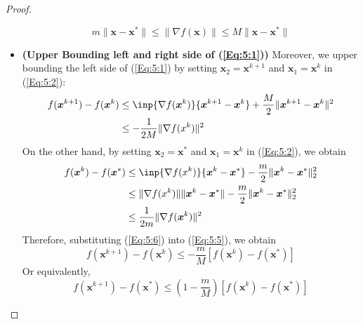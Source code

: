 \begin{proof}
\begin{itemize}
\begin{equation}
m\|\bm x-\bm x^*\|\le\|\nabla f(\bm x)\|\le M\|\bm x-\bm x^*\|
\end{equation}
\item
\textbf{(Upper Bounding left and right side of (\ref{Eq:5:1}))}
Moreover, we upper bounding the left side of (\ref{Eq:5:1}) by setting $\bm x_2 = \bm x^{k+1}$ and $\bm x_1 = \bm x^k$ in (\ref{Eq:5:2}):
\begin{equation}\label{Eq:5:5}
\begin{aligned}
f(\bm x^{k+1}) - f(\bm x^k)&\le \inp{\nabla f(\bm x^k)}{\bm x^{k+1} - \bm x^k}+\frac{M}{2}\|\bm x^{k+1}-\bm x^k\|^2\\
&\le-\frac{1}{2M}\|\nabla f(x^k)\|^2
\end{aligned}
\end{equation}
On the other hand, by setting $\bm x_2 = \bm x^*$ and $\bm x_1 = \bm x^k$ in (\ref{Eq:5:2}), we obtain
\begin{equation}\label{Eq:5:6}
\begin{aligned}
f(\bm x^k) - f(\bm x^*)&\le \inp{\nabla f(x^k)}{\bm x^k - \bm x^*}-\frac{m}{2}\|\bm x^k-\bm x^*\|_2^2\\
&\le \|\nabla f(x^k)\|\|\bm x^k - \bm x^*\| - \frac{m}{2}\|\bm x^k-\bm x^*\|_2^2\\
&\le \frac{1}{2m}\|\nabla f(\bm x^k)\|^2
\end{aligned}
\end{equation}
Therefore, substituting (\ref{Eq:5:6}) into (\ref{Eq:5:5}), we obtain
\[
f(\bm x^{k+1}) - f(\bm x^k)\le -\frac{m}{M}[f(\bm x^k) - f(\bm x^*)]
\]
Or equivalently,
\[
f(\bm x^{k+1}) - f(\bm x^*)\le\left(1-\frac{m}{M}\right)[f(\bm x^k) - f(\bm x^*)]
\]



\end{itemize}




\end{proof}














